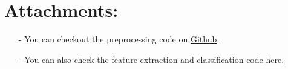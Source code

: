 \documentclass[a4paper, 11pt]{article}
\begin{document}
\section*{Attachments:}

\begin{itemize}
	\item[-] You can checkout the preprocessing code on
	\href{https://github.com/ethiy/proj.city}{Github}.
	\item[-] You can also check the feature extraction and classification code
	\href{https://github.com/ethiy/qualcity}{here}.
\end{itemize}
\end{document}

